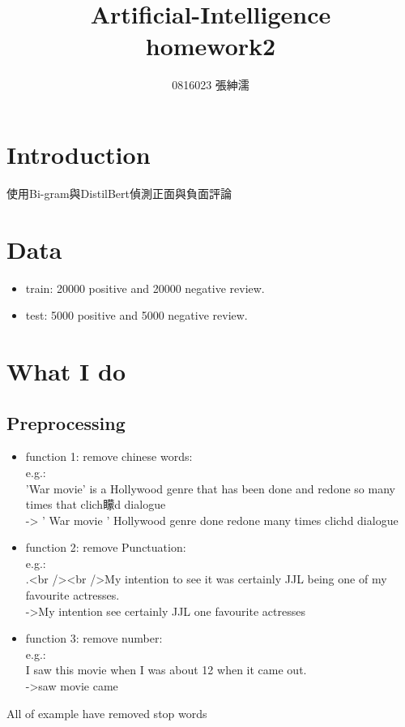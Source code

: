 \documentclass[12,a4paper]{article}
\title{{\Huge Artificial-Intelligence} \\ homework2 }
\author{0816023 張紳濡}
\date{}
\begin{document}
\maketitle
\thispagestyle{fancy}
\section{Introduction}
使用Bi-gram與DistilBert偵測正面與負面評論
\section{Data}
\begin{itemize}
\item train: 20000 positive and 20000 negative review.
\item test: 5000 positive and 5000 negative review.
\end{itemize}
\section{What I do}
\subsection{Preprocessing}
\begin{itemize}
    \item function 1: remove chinese words:\\
        e.g.:\\
        'War movie' is a Hollywood genre that has been done and redone so many times that clich矇d dialogue \\
        -> ' War movie ' Hollywood genre done redone many times clichd dialogue
    \item function 2: remove Punctuation:\\
        e.g.:\\
        .<br /><br />My intention to see it was certainly JJL being one of my favourite actresses. \\
        ->My intention see certainly JJL one favourite actresses
    \item function 3: remove number:\\
        e.g.:\\
        I saw this movie when I was about 12 when it came out.\\
        ->saw movie  came
\end{itemize}
All of example have removed stop words
\end{document}
